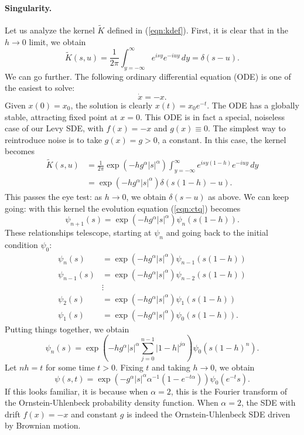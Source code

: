 \documentclass[12pt]{l4dc2021}
\begin{document}
\paragraph{Singularity.} Let us analyze the kernel $\widetilde{K}$ defined in (\ref{eqn:kdef}).  First, it is clear that in the $h \to 0$ limit, we obtain
\[
\widetilde{K}(s,u) = \frac{1}{2\pi}\int_{y=-\infty}^{\infty}e^{is y} e^{-iuy}\, dy = \delta(s - u).
\]
We can go further.  The following ordinary differential equation (ODE) is one of the easiest to solve:
\[
\dot{x} = -x.
\]
Given $x(0) = x_0$, the solution is clearly $x(t) = x_0 e^{-t}$.  The ODE has a globally stable, attracting fixed point at $x = 0$.  This ODE is in fact a special, noiseless case of our Levy SDE, with $f(x) = -x$ and $g(x) \equiv 0$.  The simplest way to reintroduce noise is to take $g(x) = g > 0$, a constant.  In this case, the kernel becomes
\begin{align}
\widetilde{K}(s,u) &= \frac{1}{2\pi} \exp{\left(  -h g^\alpha |s|^{\alpha} \right)} \int_{y=-\infty}^{\infty}e^{is y \left(1 - h\right)} e^{-iuy}\, dy \nonumber \\
\label{eqn:OUprop}
 &= \exp{\left(  -h g^\alpha |s|^{\alpha} \right)} \delta( s(1-h) - u).
\end{align}
This passes the eye test: as $h \to 0$, we obtain $\delta(s-u)$ as above.  We can keep going: with this kernel the evolution equation (\ref{eqn:ctq}) becomes
\[
\psi_{n+1}(s) = \exp{\left(  -h g^\alpha |s|^{\alpha} \right)} \psi_n( s(1-h) ).
\]
These relationships telescope, starting at $\psi_n$ and going back to the initial condition $\psi_0$:
\begin{align*}
\psi_{n}(s) &= \exp{\left(  -h g^\alpha |s|^{\alpha} \right)} \psi_{n-1}( s(1-h) ) \\
\psi_{n-1}(s) &= \exp{\left(  -h g^\alpha |s|^{\alpha} \right)} \psi_{n-2}( s(1-h) ) \\
&\vdots \\
\psi_{2}(s) &= \exp{\left(  -h g^\alpha |s|^{\alpha} \right)} \psi_1( s(1-h) ) \\
\psi_{1}(s) &= \exp{\left(  -h g^\alpha |s|^{\alpha} \right)} \psi_0( s(1-h) ).
\end{align*}
Putting things together, we obtain
\[
\psi_{n}(s) = \exp \left( -h g^\alpha |s|^\alpha \sum_{j=0}^{n-1} |1-h|^{j \alpha} \right) \psi_0( s (1-h)^n ).
\]
Let $n h = t$ for some time $t > 0$.  
Fixing $t$ and taking $h \to 0$, we obtain
\[
\psi(s, t) = \exp{ \left( - g^\alpha |s|^{\alpha} \alpha^{-1} (1 - e^{-t \alpha}) \right)} \psi_0( e^{-t} s ).
\]
If this looks familiar, it is because when $\alpha = 2$, this is the Fourier transform of the Ornstein-Uhlenbeck probability density function.  When $\alpha=2$, the SDE with drift $f(x) = -x$ and constant $g$ is indeed the Ornstein-Uhlenbeck SDE driven by Brownian motion.
\end{document}
